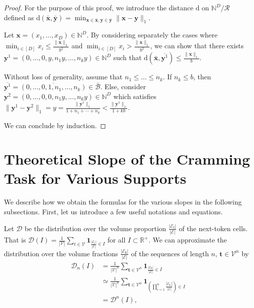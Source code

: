 \begin{proof}
    For the purpose of this proof, we introduce the distance $\mathrm d$ on $\mathbb N^D/\mathcal R$ defined as $\mathrm d(\bar{\mathbf x},\bar{\mathbf y})=\min_{\mathbf x\in\bar{\mathbf x},\mathbf y\in\bar{\mathbf y}}\|\mathbf x-\mathbf y\|_1$.

    Let $\mathbf x=(x_1,...,x_{D})\in\mathbb N^D$. By considering separately the cases where $\min_{i\in[D]}x_i\leq\frac{\|\mathbf x\|_1}{b^2}$ and $\min_{i\in[D]}x_i>\frac{\|\mathbf x\|_1}{b^2}$, we can show that there exists $\mathbf y^1=(0,\ldots,0,y,n_1y,\ldots,n_ky)\in\mathbb N^D$ such that $\mathrm d(\bar{\mathbf x},\overline{\mathbf y^1})\leq \frac{\|\mathbf x\|_1}{b}$.
    
    Without loss of generality, assume that $n_1\leq\ldots\leq n_{k}$. If $n_k\leq b$, then $\overline{\mathbf y^1}=\overline{(0,\ldots,0,1,n_1,\ldots,n_k)}\in\bar{\mathcal B}$. Else, consider $\mathbf y^2=(0,\ldots,0,0,n_1y,\ldots,n_ky)\in\mathbb N^D$ which satisfies $\|\mathbf y^1-\mathbf y^2\|_1=y= \frac{\|\mathbf y^1\|_1}{1+n_1+\cdots+n_k}<\frac{\|\mathbf y^1\|_1}{1+kb}$.

    We can conclude by induction.
\end{proof}

\section{Theoretical Slope of the Cramming Task for Various Supports}
\label{app:shapes}

We describe how we obtain the formulas for the various slopes in the following subsections. First, let us introduce a few useful notations and equations.

Let $\mathcal D$ be the distribution over the volume proportion $\frac{|\mathcal{E}_t|}{|\mathcal E|}$ of the next-token cells. That is $\mathcal D(I)=\frac1{|\mathcal V|}\sum_{t\in\mathcal V}\mathbf 1_{\frac{|\mathcal{E}_t|}{|\mathcal E|}\in I}$ for all $I\subset\mathbb R^+$. We can approximate the distribution over the volume fractions $\frac{|\mathcal{E}_{\mathbf t}|}{|\mathcal E|}$ of the sequences of length $n$, $\mathbf t\in\mathcal V^n$ by 
\begin{align}\label{eq:assumption}
    \mathcal D_n(I)&=\frac1{|\mathcal V|^n}\sum_{\mathbf t\in\mathcal V^n}\mathbf 1_{\frac{|\mathcal{E}_{\mathbf t}|}{|\mathcal E|}\in I}\nonumber\\
    &\simeq\frac1{|\mathcal V|^n}\sum_{\mathbf t\in\mathcal V^n}\mathbf 1_{(\prod_{i=1}^n\frac{|\mathcal{E}_{\mathbf t_i}|}{|\mathcal E|})\in I}\nonumber\\
&= \mathcal D^n(I),
\end{align}

